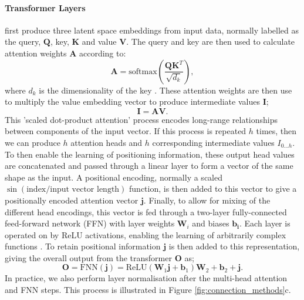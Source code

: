 \paragraph{Transformer Layers} first produce three latent space embeddings from input data, normally labelled as the query, $\boldsymbol Q$, key, $\boldsymbol K$ and value $\boldsymbol V$. The query and key are then used to calculate attention weights $\boldsymbol{A}$ according to:
\begin{equation}
    \boldsymbol{A} = \text{softmax}\left(\frac{\boldsymbol{Q}\boldsymbol{K}^T}{\sqrt{d_k}}\right),
\end{equation}
where $d_k$ is the dimensionality of the key \cite{vaswani_attention_2023}. These attention weights are then use to multiply the value embedding vector to produce intermediate values $\boldsymbol{I}$;
\begin{equation}
    \boldsymbol{I} = \boldsymbol{A}\boldsymbol{V}.
\end{equation}
This 'scaled dot-product attention' process encodes long-range relationships between components of the input vector. If this process is repeated $h$ times, then we can produce $h$ attention heads and $h$ corresponding intermediate values $I_{0\dots h}$. To then enable the learning of positioning information, these output head values are concatenated and passed through a linear layer to form a vector of the same shape as the input. A positional encoding, normally a scaled $\sin(\text{index}/\text{input vector length})$ function, is then added to this vector to give a positionally encoded attention vector $\boldsymbol{j}$. Finally, to allow for mixing of the different head encodings, this vector is fed through a two-layer fully-connected feed-forward network (FFN) with layer weights $\boldsymbol W_i$ and biases $\boldsymbol{b_i}$. Each layer is operated on by ReLU activations, enabling the learning of arbitrarily complex functions \cite{vaswani_attention_2023}. To retain positional information $\boldsymbol{j}$ is then added to this representation, giving the overall output from the transformer $\boldsymbol{O}$ as;
\begin{equation}
    \boldsymbol{O} = \text{FNN}(\boldsymbol{j})= \text{ReLU}(\boldsymbol{W}_1\boldsymbol{j} + \boldsymbol{b}_1)\boldsymbol{W}_2 + \boldsymbol{b}_2 + \boldsymbol{j}.
\end{equation}
In practice, we also perform layer normalisation after the multi-head attention and FNN steps. This process is illustrated in Figure \ref{fig:connection_methods}c.